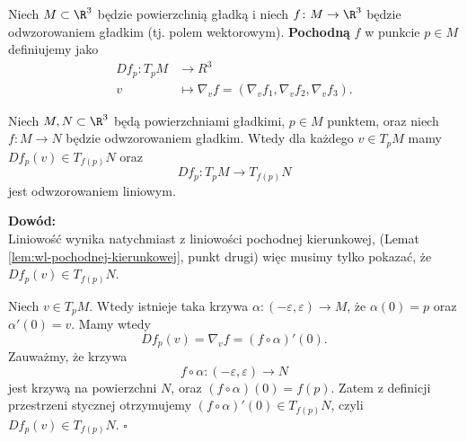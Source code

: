 \begin{frame}[<+->]

\begin{definicja}
Niech $M\subset \R^3$ będzie powierzchnią gładką i niech $f\colon M\to \R^3$ będzie odwzorowaniem gładkim (tj. polem wektorowym). \textbf{Pochodną} $f$ w punkcie $p\in M$ definiujemy jako
\begin{align*}
Df_p\colon T_pM&\to R^3\\
v&\mapsto \nabla_v f=\left(\nabla_v f_1,\nabla_v f_2,\nabla_v f_3\right).
\end{align*}
\end{definicja}

\end{frame}
\begin{frame}

\begin{lemat}
Niech $M,N\subset \R^3$ będą powierzchniami gładkimi, $p\in M$ punktem, oraz niech $f\colon M\to N$ będzie odwzorowaniem gładkim. Wtedy dla każdego $v\in T_pM$ mamy $Df_p(v)\in T_{f(p)}N$ oraz \[Df_p\colon T_pM\to T_{f(p)}N\] jest odwzorowaniem liniowym.

\end{lemat}

\pause \textcolor{ared}{\textbf{Dowód: }}\\\pause
Liniowość wynika natychmiast z liniowości pochodnej kierunkowej, (Lemat \ref{lem:wl-pochodnej-kierunkowej}, punkt drugi) więc musimy tylko pokazać, że $Df_p(v)\in T_{f(p)}N$.

\end{frame}
\begin{frame}[<+->]

Niech $v\in T_pM$. Wtedy istnieje taka krzywa $\alpha\colon (-\varepsilon,\varepsilon)\to M$, że $\alpha(0)=p$ oraz $\alpha'(0)=v$. Mamy wtedy \[Df_p(v)=\nabla_v f=(f\circ \alpha)'(0).\]
\pause Zauważmy, że krzywa \[f\circ\alpha\colon (-\varepsilon,\varepsilon)\to N\] jest krzywą na powierzchni $N$, oraz $(f\circ \alpha)(0)=f(p)$. \pause Zatem z definicji przestrzeni stycznej otrzymujemy $(f\circ \alpha)'(0)\in T_{f(p)}N$, czyli $Df_p(v)\in T_{f(p)}N$.
\hfill $\square$

\end{frame}
